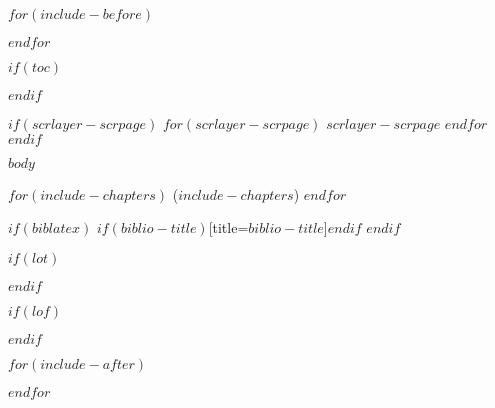 \documentclass[$if(fontsize)$$fontsize$,$endif$$if(lang)$$lang$,$endif$$if(papersize)$$papersize$,$endif$$for(classoption)$$classoption$$sep$,$endfor$]{$documentclass$}
\begin{document}
\frontmatter

$for(include-before)$
  
$endfor$

\clearpage

$if(toc)$
  \hypersetup{linkcolor=black}
  \setcounter{tocdepth}{$toc-depth$}
    \tableofcontents
    \pagestyle{plain}
    \restoregeometry
    \cleardoublepage
$endif$


$if(scrlayer-scrpage)$
  $for(scrlayer-scrpage)$
    $scrlayer-scrpage$
  $endfor$
$endif$

\mainmatter

$body$

$for(include-chapters)$
  ($include-chapters$)
$endfor$

\printglossary[title=Glossar,nonumberlist]


$if(biblatex)$
  \printbibliography$if(biblio-title)$[title=$biblio-title$]$endif$
$endif$

\backmatter

$if(lot)$
    \listoftables
  \restoregeometry
  \clearpage
$endif$

$if(lof)$
    \listoffigures
  \restoregeometry
  \clearpage
$endif$


$for(include-after)$
  
$endfor$

\begin{appendix}

\end{appendix}

\end{document}
